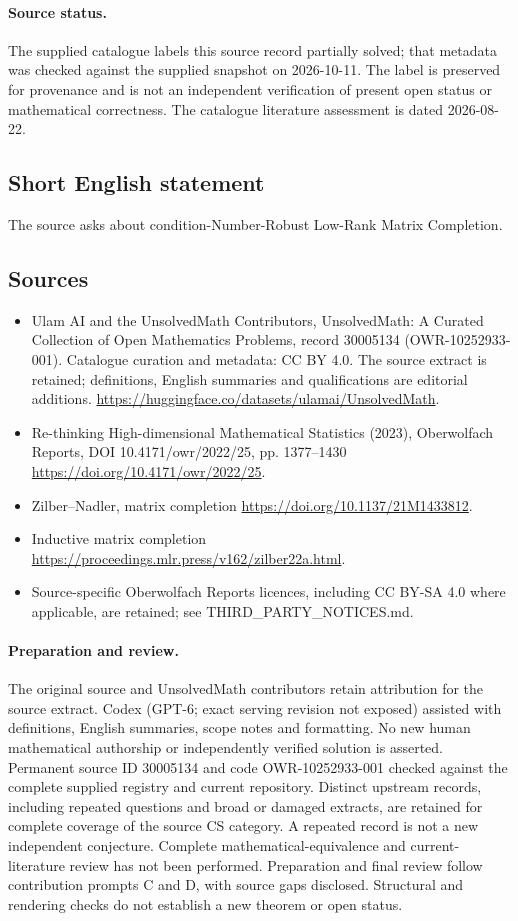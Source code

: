 \documentclass[11pt]{article}
\begin{document}
\paragraph{Source status.}
The supplied catalogue labels this source record partially solved; that metadata was checked against the supplied snapshot on 2026-10-11. The label is preserved for provenance and is not an independent verification of present open status or mathematical correctness. The catalogue literature assessment is dated 2026-08-22.
\subsection{Short English statement}
The source asks about condition-Number-Robust Low-Rank Matrix Completion.
\subsection{Sources}
\begin{itemize}
\item[S1] Ulam AI and the UnsolvedMath Contributors, UnsolvedMath: A Curated Collection of Open Mathematics Problems, record 30005134 (OWR-10252933-001). Catalogue curation and metadata: CC BY 4.0. The source extract is retained; definitions, English summaries and qualifications are editorial additions.
\url{https://huggingface.co/datasets/ulamai/UnsolvedMath}.
\item[S2] Re-thinking High-dimensional Mathematical Statistics (2023), Oberwolfach Reports, DOI 10.4171/owr/2022/25, pp. 1377--1430
\url{https://doi.org/10.4171/owr/2022/25}.
\item[S3] Zilber--Nadler, matrix completion
\url{https://doi.org/10.1137/21M1433812}.
\item[S4] Inductive matrix completion
\url{https://proceedings.mlr.press/v162/zilber22a.html}.
\item Source-specific Oberwolfach Reports licences, including CC BY-SA 4.0 where applicable, are retained; see THIRD\_PARTY\_NOTICES.md.
\end{itemize}
\paragraph{Preparation and review.}
The original source and UnsolvedMath contributors retain attribution for the source extract. Codex (GPT-6; exact serving revision not exposed) assisted with definitions, English summaries, scope notes and formatting. No new human mathematical authorship or independently verified solution is asserted. Permanent source ID 30005134 and code OWR-10252933-001 checked against the complete supplied registry and current repository. Distinct upstream records, including repeated questions and broad or damaged extracts, are retained for complete coverage of the source CS category. A repeated record is not a new independent conjecture. Complete mathematical-equivalence and current-literature review has not been performed. Preparation and final review follow contribution prompts C and D, with source gaps disclosed. Structural and rendering checks do not establish a new theorem or open status.
\label{end:30005134}
\end{document}
